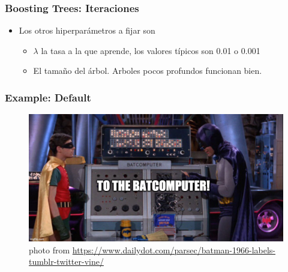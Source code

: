 \documentclass[
  shownotes,
  xcolor={svgnames},
  hyperref={colorlinks,citecolor=DarkBlue,linkcolor=andesred,urlcolor=DarkBlue}
  , aspectratio=169]{beamer}
\begin{document}
\begin{frame}[fragile]
\frametitle{Boosting Trees: Iteraciones}

\begin{itemize}

\item Los otros hiperparámetros a fijar son
\bigskip
\begin{itemize}
  \item $\lambda$ la tasa a la que aprende, los valores típicos son 0.01 o 0.001
\bigskip
\item El tamaño del árbol. Arboles pocos profundos funcionan bien.
\end{itemize}
\end{itemize}
\end{frame}
\begin{frame}[fragile]
\frametitle{Example: Default}
\begin{figure}[H] \centering
  \centering
  \includegraphics[scale=0.35]{figures/baticomputer_meme.jpg}
  \\
  \tiny photo from \url{https://www.dailydot.com/parsec/batman-1966-labels-tumblr-twitter-vine/}
\end{figure}


\end{frame}

\end{document}

